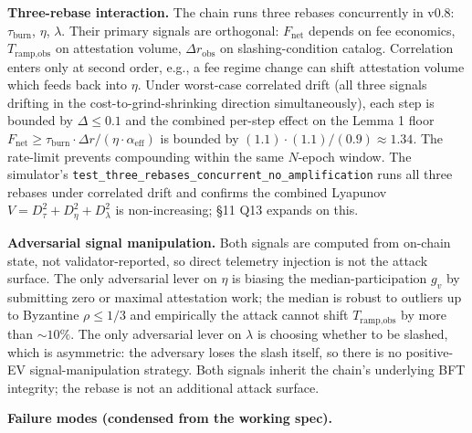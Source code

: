 \documentclass[
  11pt,
]{article}
\begin{document}
\textbf{Three-rebase interaction.} The chain runs three rebases
concurrently in v0.8: \(\tau_{\text{burn}}\), \(\eta\), \(\lambda\).
Their primary signals are orthogonal: \(F_{\text{net}}\) depends on fee
economics, \(T_{\text{ramp,obs}}\) on attestation volume,
\(\Delta r_{\text{obs}}\) on slashing-condition catalog. Correlation
enters only at second order, e.g., a fee regime change can shift
attestation volume which feeds back into \(\eta\). Under worst-case
correlated drift (all three signals drifting in the
cost-to-grind-shrinking direction simultaneously), each step is bounded
by \(\Delta \leq 0.1\) and the combined per-step effect on the Lemma 1
floor
\(F_{\text{net}} \geq \tau_{\text{burn}} \cdot \Delta r / (\eta \cdot \alpha_{\text{eff}})\)
is bounded by \((1.1) \cdot (1.1) / (0.9) \approx 1.34\). The rate-limit
prevents compounding within the same \(N\)-epoch window. The simulator's
\texttt{test\_three\_rebases\_concurrent\_no\_amplification} runs all
three rebases under correlated drift and confirms the combined Lyapunov
\(V = D_\tau^2 + D_\eta^2 + D_\lambda^2\) is non-increasing; §11 Q13
expands on this.

\textbf{Adversarial signal manipulation.} Both signals are computed from
on-chain state, not validator-reported, so direct telemetry injection is
not the attack surface. The only adversarial lever on \(\eta\) is
biasing the median-participation \(g_v\) by submitting zero or maximal
attestation work; the median is robust to outliers up to Byzantine
\(\rho \leq 1/3\) and empirically the attack cannot shift
\(T_{\text{ramp,obs}}\) by more than \(\sim 10\%\). The only adversarial
lever on \(\lambda\) is choosing whether to be slashed, which is
asymmetric: the adversary loses the slash itself, so there is no
positive-EV signal-manipulation strategy. Both signals inherit the
chain's underlying BFT integrity; the rebase is not an additional attack
surface.

\textbf{Failure modes (condensed from the working spec).}
\end{document}
